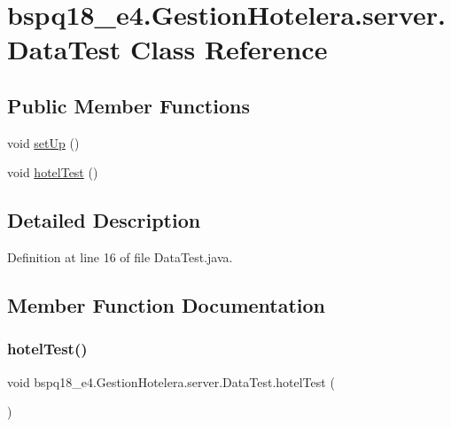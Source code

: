 \hypertarget{classbspq18__e4_1_1_gestion_hotelera_1_1server_1_1_data_test}{}\section{bspq18\+\_\+e4.\+Gestion\+Hotelera.\+server.\+Data\+Test Class Reference}
\label{classbspq18__e4_1_1_gestion_hotelera_1_1server_1_1_data_test}
\subsection*{Public Member Functions}
\begin{DoxyCompactItemize}
\item 
void \mbox{\hyperlink{classbspq18__e4_1_1_gestion_hotelera_1_1server_1_1_data_test_ae6efbcee0d351a598d969295d5d02d1f}{set\+Up}} ()
\item 
void \mbox{\hyperlink{classbspq18__e4_1_1_gestion_hotelera_1_1server_1_1_data_test_ad240316e65e0380d8cf78d1448f472a9}{hotel\+Test}} ()
\end{DoxyCompactItemize}


\subsection{Detailed Description}


Definition at line 16 of file Data\+Test.\+java.



\subsection{Member Function Documentation}
\mbox{\label{classbspq18__e4_1_1_gestion_hotelera_1_1server_1_1_data_test_ad240316e65e0380d8cf78d1448f472a9}} 
\subsubsection{\texorpdfstring{hotel\+Test()}{hotelTest()}}
{\footnotesize\ttfamily void bspq18\+\_\+e4.\+Gestion\+Hotelera.\+server.\+Data\+Test.\+hotel\+Test (\begin{DoxyParamCaption}{ }\end{DoxyParamCaption})}




